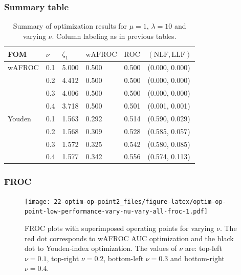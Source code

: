 \documentclass[
]{book}
\begin{document}
\hypertarget{summary-table-9}{%
\subsubsection{Summary table}\label{summary-table-9}}

\begin{table}

\caption{\label{tab:optim-op-point-low-performance-vary-nu-table-vary-all}Summary of optimization results for $\mu = 1$, $\lambda = 10$ and varying $\nu$. Column labeling as in previous tables.}
\centering
\fontsize{10}{12}\selectfont
\begin{tabular}[t]{llllll}
\toprule
FOM & $\nu$ & $\zeta_1$ & $\text{wAFROC}$ & $\text{ROC}$ & $\left( \text{NLF}, \text{LLF}\right)$\\
\midrule
wAFROC & 0.1 & 5.000 & 0.500 & 0.500 & (0.000, 0.000)\\
 & 0.2 & 4.412 & 0.500 & 0.500 & (0.000, 0.000)\\
 & 0.3 & 4.006 & 0.500 & 0.500 & (0.000, 0.000)\\
 & 0.4 & 3.718 & 0.500 & 0.501 & (0.001, 0.001)\\
Youden & 0.1 & 1.563 & 0.292 & 0.514 & (0.590, 0.029)\\
\addlinespace
 & 0.2 & 1.568 & 0.309 & 0.528 & (0.585, 0.057)\\
 & 0.3 & 1.572 & 0.325 & 0.542 & (0.580, 0.085)\\
 & 0.4 & 1.577 & 0.342 & 0.556 & (0.574, 0.113)\\
\bottomrule
\end{tabular}
\end{table}

\hypertarget{froc-10}{%
\subsubsection{FROC}\label{froc-10}}

\begin{figure}
\centering
\texttt{[image: 22-optim-op-point2\_files/figure-latex/optim-op-point-low-performance-vary-nu-vary-all-froc-1.pdf]}
\caption{\label{fig:optim-op-point-low-performance-vary-nu-vary-all-froc}FROC plots with superimposed operating points for varying \(\nu\). The red dot corresponds to wAFROC AUC optimization and the black dot to Youden-index optimization. The values of \(\nu\) are: top-left \(\nu = 0.1\), top-right \(\nu = 0.2\), bottom-left \(\nu = 0.3\) and bottom-right \(\nu = 0.4\).}
\end{figure}
\end{document}
